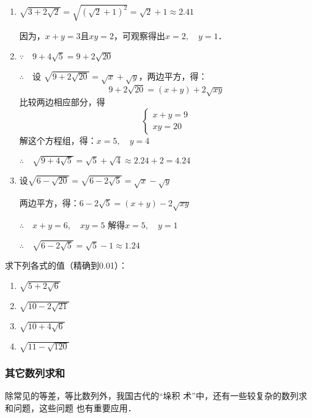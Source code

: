 \begin{solution}
\begin{enumerate}
    \item $\sqrt{3+2\sqrt{2}}=\sqrt{(\sqrt{2}+1)^2}=\sqrt{2}+1\approx 2.41$
    
因为，$x+y=3$且$xy=2$，可观察得出$x=2,\quad y=1$．
\item $\because\quad 9+4\sqrt{5}=9+2\sqrt{20}$

$\therefore\quad $设 $\sqrt{9+2\sqrt{20}}=\sqrt{x}+\sqrt{y}$，两边平方，得：
\[9+2\sqrt{20}=(x+y)+2\sqrt{xy}\]
比较两边相应部分，得
\[\begin{cases}
    x+y=9\\
xy=20
\end{cases}\]
解这个方程组，得：$x=5,\quad y=4$

$\therefore\quad \sqrt{9+4\sqrt{5}}=\sqrt{5}+\sqrt{4}\approx 2.24+2=4.24$

\item 设$\sqrt{6-\sqrt{20}}=\sqrt{6-2\sqrt{5}}=\sqrt{x}-\sqrt{y}$

两边平方，得：$6-2\sqrt{5}=(x+y)-2\sqrt{xy}$

$\therefore\quad x+y=6,\quad xy=5$
解得$x=5,\quad y=1$

$\therefore\quad \sqrt{6-2\sqrt{5}}=\sqrt{5}-1\approx 1.24$

\end{enumerate}
\end{solution}

\begin{ex}
    求下列各式的值（精确到0.01）：
\begin{multicols}{2}
    \begin{enumerate}
        \item $\sqrt{5+2\sqrt{6}}$
        \item $\sqrt{10-2\sqrt{21}}$
        \item $\sqrt{10+4\sqrt{6}}$
        \item $\sqrt{11-\sqrt{120}}$
    \end{enumerate}
\end{multicols}
\end{ex}






\subsubsection{其它数列求和}
除常见的等差，等比数列外，我国古代的“垛积
术”中，还有一些较复杂的数列求和问题，这些问题
也有重要应用．



